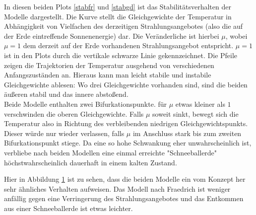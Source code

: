 \documentclass[]{report}
\begin{document}
In diesen beiden Plots \ref{stabfr} und \ref{stabgd} ist das Stabilitätsverhalten der Modelle dargestellt. Die Kurve stellt die Gleichgewichte der Temperatur in Abhängigkeit von Vielfachen des derzeitigen Strahlungsangebotes (also die auf der Erde eintreffende Sonnenenergie) dar. Die Veränderliche ist hierbei $\mu$, wobei $\mu = 1$ dem derzeit auf der Erde vorhandenen Strahlungsangebot entspricht. $\mu = 1$ ist in den Plots durch die vertikale schwarze Linie gekennzeichnet. Die Pfeile zeigen die Trajektorien der Temperatur ausgehend von verschiedenen Anfangszuständen an. Hieraus kann man leicht stabile und instabile Gleichgewichte ablesen: Wo drei Gleichgewichte vorhanden sind, sind die beiden äußeren stabil und das innere abstoßend.\\
Beide Modelle enthalten zwei Bifurkationspunkte. für $\mu$ etwas kleiner als $1$ verschwinden die oberen Gleichgewichte. Falls $\mu$ soweit sinkt, bewegt sich die Temperatur also in Richtung des verbleibenden niedrigen Gleichgewichtspunkts. Dieser würde nur wieder verlassen, falls $\mu$ im Anschluss stark bis zum zweiten Bifurkationspunkt stiege. Da eine so hohe Schwankung eher unwahrscheinlich ist, verbliebe nach beiden Modellen eine einmal erreichte "Schneeballerde" höchstwahrscheinlich dauerhaft in einem kalten Zustand.

\begin{figure}[h!] \centering \def\svgwidth{\columnwidth}  \caption{} \label{comp} \end{figure}

Hier in Abbildung \ref{comp} ist zu sehen, dass die beiden Modelle ein vom Konzept her sehr ähnliches Verhalten aufweisen. Das Modell nach Fraedrich ist weniger anfällig gegen eine Verringerung des Strahlungsangebotes und das Entkommen aus einer Schneeballerde ist etwas leichter.
\end{document}
